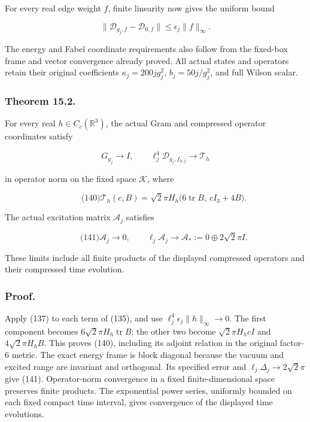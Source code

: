For every real edge weight \(f\), finite linearity now gives the uniform
bound

\[
\|\mathcal D_{g_j,f}-\mathcal D_{0,f}\|
 \le\epsilon_j\|f\|_\infty.
\]

The energy and Fabel coordinate requirements also follow from the
fixed-box frame and vector convergence already proved. All actual states
and operators retain their original coefficients \(\kappa_j=200jg_j^2\),
\(b_j=50j/g_j^2\), and full Wilson scalar.

\subsubsection{Theorem 15.2.}\label{local-energy-band-transfer-md-theorem-15.2.}

For every real \(h\in C_c(\mathbb R^3)\), the actual Gram and compressed
operator coordinates satisfy

\[
G_{g_j}\to I,\qquad
 \ell_j^4\mathcal D_{g_j,f_{h,j}}\to\mathcal T_h
\]

in operator norm on the fixed space \(\mathcal K\), where

\[
\qquad\text{(140)}
 \mathcal T_h(c,B)=
 \sqrt2\pi H_h\bigl(6\operatorname{tr}B,\ cI_3+4B\bigr).
\]

The actual excitation matrix \(\mathcal A_j\) satisfies

\[
\qquad\text{(141)}
 \mathcal A_j\to0,\qquad
 \ell_j\mathcal A_j\to
       \mathcal A_*:=0\oplus2\sqrt2\pi I.
\]

These limits include all finite products of the displayed compressed
operators and their compressed time evolution.

\subsubsection{Proof.}\label{local-energy-band-transfer-md-proof.-1}

Apply (137) to each term of (135), and use
\(\ell_j^4\epsilon_j\|h\|_\infty\to0\). The first component becomes
\(6\sqrt2\pi H_h\operatorname{tr}B\); the other two become
\(\sqrt2\pi H_hcI\) and \(4\sqrt2\pi H_hB\). This proves (140),
including its adjoint relation in the original factor-\(6\) metric. The
exact energy frame is block diagonal because the vacuum and excited
range are invariant and orthogonal. Its specified error and
\(\ell_j\Delta_j\to2\sqrt2\pi\) give (141). Operator-norm convergence in
a fixed finite-dimensional space preserves finite products. The
exponential power series, uniformly bounded on each fixed compact time
interval, gives convergence of the displayed time evolutions.

